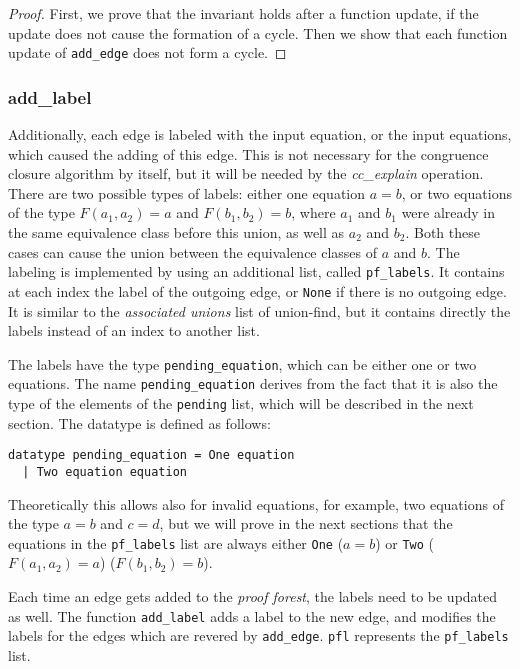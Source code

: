\begin{proof}
First, we prove that the invariant holds after a function update, if the update does not cause the formation of a cycle. Then we show that each function update of \lstinline|add_edge| does not form a cycle.
\end{proof}

\subsubsection{add\_label}
\label{subsubsection:addlabel}

Additionally, each edge is labeled with the input equation, or the input equations, which caused the adding of this edge. This is not necessary for the congruence closure algorithm by itself, but it will be needed by the \emph{cc\_explain} operation.
There are two possible types of labels: either one equation $a = b$, or two equations of the type $F(a_1, a_2) = a$ and $F(b_1, b_2) = b$, where $a_1$ and $b_1$ were already in the same equivalence class before this union, as well as $a_2$ and $b_2$.
Both these cases can cause the union between the equivalence classes of $a$ and $b$.
The labeling is implemented by using an additional list, called \lstinline|pf_labels|.
It contains at each index the label of the outgoing edge, or \lstinline|None| if there is no outgoing edge.
It is similar to the \emph{associated unions} list of union-find, but it contains directly the labels instead of an index to another list.

The labels have the type \lstinline|pending_equation|, which can be either one or two equations. The name \lstinline|pending_equation| derives from the fact that it is also the type of the elements of the \lstinline|pending| list, which will be described in the next section. The datatype is defined as follows:

\begin{lstlisting}
datatype pending_equation = One equation
  | Two equation equation
\end{lstlisting}

Theoretically this allows also for invalid equations, for example, two equations of the type $a = b$ and $c = d$, but we will prove in the next sections that the equations in the \lstinline|pf_labels| list are always either \lstinline{One} ($a = b$) or \lstinline{Two} ($F(a_1, a_2) = a$) ($F(b_1, b_2) = b$).

Each time an edge gets added to the \emph{proof forest}, the labels need to be updated as well. The function \lstinline{add_label} adds a label to the new edge, and modifies the labels for the edges which are revered by \lstinline{add_edge}. \lstinline|pfl| represents the \lstinline|pf_labels| list.

